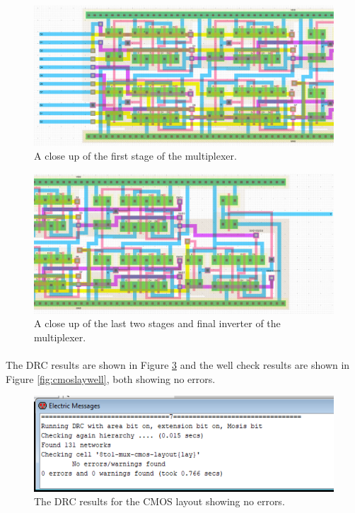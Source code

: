 \documentclass{article}
\begin{document}
    \begin{figure}[H]
      \centering
      \includegraphics[width=\linewidth, frame]{screenshots/cmos/lay/lay2.png}
      \caption{A close up of the first stage of the multiplexer.}
      \label{fig:cmoslay2}
    \end{figure}

    \begin{figure}[H]
      \centering
      \includegraphics[width=\linewidth, frame]{screenshots/cmos/lay/lay3.png}
      \caption{A close up of the last two stages and final inverter of the multiplexer.}
      \label{fig:cmoslay3}
    \end{figure}

    \paragraph{}
    The DRC results are shown in Figure \ref{fig:cmoslaydrc} and the well check results are shown in Figure \ref{fig:cmoslaywell}, both showing no errors.

    \begin{figure}[H]
      \centering
      \includegraphics[width=0.6\linewidth, frame]{screenshots/cmos/lay/drc.png}
      \caption{The DRC results for the CMOS layout showing no errors.}
      \label{fig:cmoslaydrc}
    \end{figure}
\end{document}
